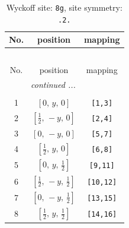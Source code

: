 \documentclass[fleqn,8pt]{jsarticle}
\begin{document}
\renewcommand{\arraystretch}{1.2}
\begin{longtable}{ccc}
\caption{Wyckoff site: {\tt 8g}, site symmetry: {\tt .2.}}
 \\
 \hline \hline
No. & position & mapping \\ \hline \endfirsthead

\multicolumn{2}{l}{\tablename\ \thetable{}} \\
 \hline \hline
No. & position & mapping \\ \hline \endhead

 \hline \hline
\multicolumn{2}{r}{\footnotesize\it continued ...} \\ \endfoot

 \hline \hline
\multicolumn{2}{r}{} \\ \endlastfoot

1 & $\left[ 0,\, y,\, 0 \right]$ & {\tt [1,3]} \\ \hline
2 & $\left[ \frac{1}{2},\, - y,\, 0 \right]$ & {\tt [2,4]} \\ \hline
3 & $\left[ 0,\, - y,\, 0 \right]$ & {\tt [5,7]} \\ \hline
4 & $\left[ \frac{1}{2},\, y,\, 0 \right]$ & {\tt [6,8]} \\ \hline
5 & $\left[ 0,\, y,\, \frac{1}{2} \right]$ & {\tt [9,11]} \\ \hline
6 & $\left[ \frac{1}{2},\, - y,\, \frac{1}{2} \right]$ & {\tt [10,12]} \\ \hline
7 & $\left[ 0,\, - y,\, \frac{1}{2} \right]$ & {\tt [13,15]} \\ \hline
8 & $\left[ \frac{1}{2},\, y,\, \frac{1}{2} \right]$ & {\tt [14,16]} \\
\end{longtable}
\renewcommand{\arraystretch}{1.2}
\end{document}
